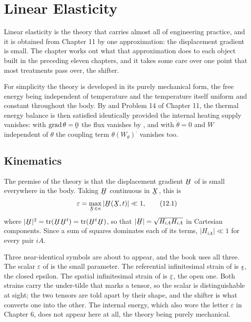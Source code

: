 \chapter{Linear Elasticity}

Linear elasticity is the theory that carries almost all of engineering
practice, and it is obtained from Chapter 11 by one approximation:
the displacement gradient is small. The chapter works out what that
approximation does to each object built in the preceding eleven
chapters, and it takes some care over one point that most treatments
pass over, the shifter.

For simplicity the theory is developed in its purely mechanical form,
the free energy being independent of temperature and the temperature
itself uniform and constant throughout the body. By  and
Problem 14 of Chapter 11, the thermal energy balance is then satisfied
identically provided the internal heating supply vanishes: with
$\grad\theta=\bze$ the flux vanishes by , and with
$\dot\theta=0$ and $W$ independent of $\theta$ the coupling term
$\theta(W_{\theta})^{\textstyle\cdot}$ vanishes too.

\section{Kinematics}\label{sec:ch12kin}

The premise of the theory is that the displacement gradient $\bH$ of
 is small everywhere in the body. Taking $\bH$ continuous in
$\bX$, this is
\begin{equation}
   \varepsilon=\max_{\bX\in\kappa}|\bH(\bX,t)|\ll1 ,
   \tag{12.1}\label{eq:12.1}
\end{equation}
where $|\bH|^{2}=\tr(\bH\bH^{t})=\tr(\bH^{t}\bH)$, so that
$|\bH|=\sqrt{H_{iA}H_{iA}}$ in Cartesian components. Since a sum of
squares dominates each of its terms, $|H_{iA}|\ll1$ for every pair
$iA$.

\begin{remark}%
\label{rem:ch12eps}
Three near-identical symbols are about to appear, and the book uses all
three. The scalar $\varepsilon$ of  is the small parameter.
The referential infinitesimal strain of  is
$\vek{\epsilon}$, the closed epsilon. The spatial infinitesimal strain
of  is $\vek{\varepsilon}$, the open one. Both strains carry
the under-tilde that marks a tensor, so the scalar is distinguishable
at sight; the two tensors are told apart by their shape, and the
shifter is what converts one into the other. The internal energy, which
also wore the letter $\varepsilon$ in Chapter 6, does not appear here at
all, the theory being purely mechanical.
\end{remark}

